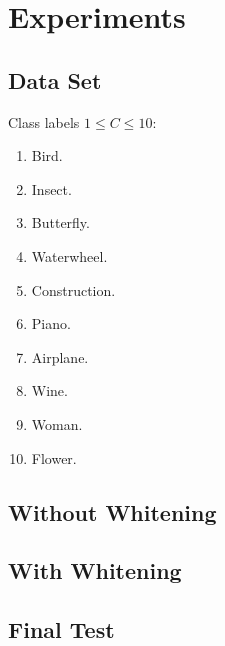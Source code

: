 \documentclass{acm_proc_article-sp}
\begin{document}
\section{Experiments}

\subsection{Data Set}
Class labels $1\leq C \leq 10$:
\begin{enumerate}[1.]
\item Bird.
\item Insect.
\item Butterfly.
\item Waterwheel.
\item Construction.
\item Piano.
\item Airplane.
\item Wine.
\item Woman.
\item Flower.
\end{enumerate}

\subsection{Without Whitening}

\subsection{With Whitening}

\subsection{Final Test}
\end{document}
